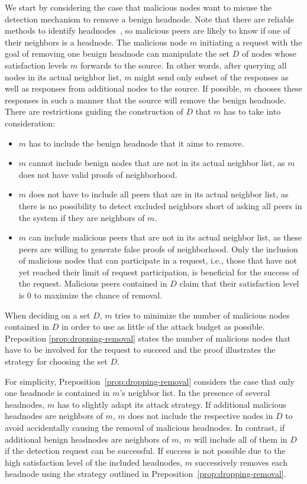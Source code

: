 We start by considering the case that malicious nodes want to misuse the detection mechanism to remove a benign headnode. 
Note that there are reliable methods to identify headnodes~\cite{nguyen2016swap}, so malicious peers are likely to know if one of their neighbors is a headnode.  
The malicious node $m$ initiating a request with the goal of removing one benign headnode can manipulate the set $D$ of nodes whose satisfaction levels $m$ forwards to the source. 
In other words, after querying all nodes in its actual neighbor list, $m$ might send only  subset of the responses as well as responses from additional nodes to the source. If possible, $m$ chooses these responses in such a manner that the source will remove the benign headnode. 
There are restrictions guiding the construction of $D$ that $m$ has to take into consideration:
\begin{itemize}
\item $m$ has to include the benign headnode that it aims to remove. 
\item $m$ cannot include benign nodes that are not in its actual neighbor list, as $m$ does not have valid proofs of neighborhood. 
\item $m$ does not have to include all peers that are in its actual neighbor list, as there is no possibility to detect excluded neighbors short of asking all peers in the system if they are neighbors of $m$. 
\item $m$ can include malicious peers that are not in its actual neighbor list, as these peers are willing to generate false proofs of neighborhood. Only the inclusion of malicious nodes that can participate in a \drop request, i.e., those that have not yet reached their limit of \drop request participation, is beneficial for the success of the request. Malicious peers contained in $D$ claim that their satisfaction level is 0 to maximize the chance of removal. 
\end{itemize}

When deciding on a set $D$, $m$ tries to minimize the number of malicious nodes contained in $D$ in order to use as little of the attack budget as possible. 
Preposition \ref{prop:dropping-removal} states the number of malicious nodes that have to be involved for the request to succeed and the proof illustrates the strategy for choosing the set $D$. 

For simplicity, Preposition~\ref{prop:dropping-removal} considers the case that only one headnode is contained in $m$'s neighbor list. In the presence of several headnodes, $m$ has to slightly adapt its attack strategy. 
If additional malicious headnodes are neighbors of $m$, $m$ does not include the respective nodes in $D$ to avoid accidentally causing the removal of malicious headnodes.  In contrast, if additional benign headnodes are neighbors of $m$, $m$ will include all of them in $D$ if the detection request can be successful. If success is not possible due to the high satisfaction level of the included headnodes, $m$ successively removes each headnode using the strategy outlined in Preposition~\ref{prop:dropping-removal}.   
 

